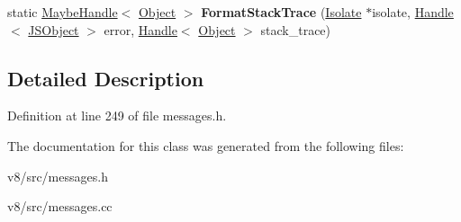 \begin{DoxyCompactItemize}
\item 
\mbox{\label{classv8_1_1internal_1_1ErrorUtils_afcfb402733b570adc0e50899245d018a}} 
static \mbox{\hyperlink{classv8_1_1internal_1_1MaybeHandle}{Maybe\+Handle}}$<$ \mbox{\hyperlink{classv8_1_1internal_1_1Object}{Object}} $>$ {\bfseries Format\+Stack\+Trace} (\mbox{\hyperlink{classv8_1_1internal_1_1Isolate}{Isolate}} $\ast$isolate, \mbox{\hyperlink{classv8_1_1internal_1_1Handle}{Handle}}$<$ \mbox{\hyperlink{classv8_1_1internal_1_1JSObject}{J\+S\+Object}} $>$ error, \mbox{\hyperlink{classv8_1_1internal_1_1Handle}{Handle}}$<$ \mbox{\hyperlink{classv8_1_1internal_1_1Object}{Object}} $>$ stack\+\_\+trace)
\end{DoxyCompactItemize}


\subsection{Detailed Description}


Definition at line 249 of file messages.\+h.



The documentation for this class was generated from the following files\+:\begin{DoxyCompactItemize}
\item 
v8/src/messages.\+h\item 
v8/src/messages.\+cc\end{DoxyCompactItemize}
